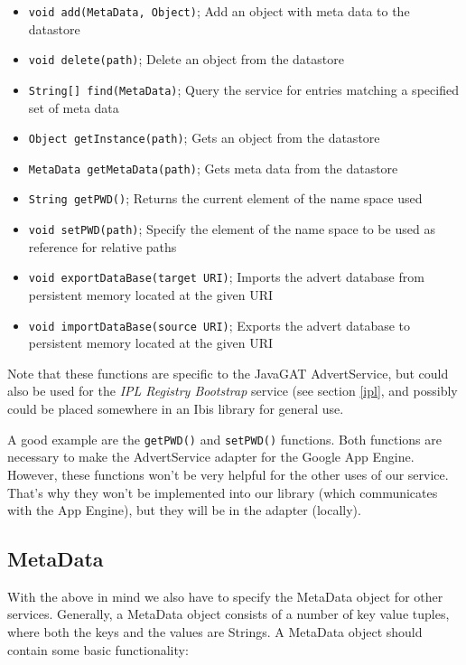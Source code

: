 \begin{itemize}
\item \texttt{void add(MetaData, Object)}; Add an object with meta data to the
datastore
\item \texttt{void delete(path)}; Delete an object from the datastore
\item \texttt{String[] find(MetaData)}; Query the service for entries matching
a specified set of meta data
\item \texttt{Object getInstance(path)}; Gets an object from the datastore
\item \texttt{MetaData getMetaData(path)}; Gets meta data from the datastore
\item \texttt{String getPWD()}; Returns the current element of the name space
used
\item \texttt{void setPWD(path)}; Specify the element of the name space to be
used as reference for relative paths
\item \texttt{void exportDataBase(target URI)}; Imports the advert database
from persistent memory located at the given URI
\item \texttt{void importDataBase(source URI)}; Exports the advert database to
persistent memory located at the given URI 
\end{itemize}

Note that these functions are specific to the JavaGAT AdvertService, but could
also be used for the \emph{IPL Registry Bootstrap} service (see section
\ref{ipl}, and possibly could be placed somewhere in an Ibis library for general
use.

A good example are the \texttt{getPWD()} and \texttt{setPWD()} functions. Both
functions are necessary to make the AdvertService adapter for the Google App
Engine. However, these functions won't be very helpful for the other uses of our
service. That's why they won't be implemented into our library (which
communicates with the App Engine), but they will be in the adapter (locally).

\subsection{MetaData}
With the above in mind we also have to specify the MetaData object for other
services. Generally, a MetaData object consists of a number of key value tuples,
where both the keys and the values are Strings. A MetaData object should contain
some basic functionality:

